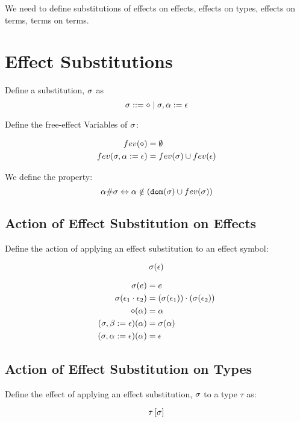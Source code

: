 \documentclass{report}
\newcommand\fev[1]{fev(#1)}
\newcommand\union[0]{\cup}
\begin{document}
        We need to define substitutions of effects on effects,
effects on types, effects on terms, terms on terms.

\section{Effect Substitutions}
Define a substitution, $\sigma$ as 
\begin{equation}
    \sigma ::= \diamond \mid \sigma, \alpha := \epsilon
 \end{equation}

 Define the free-effect Variables of $\sigma$:

 \begin{align*}
     \fev{\nil} & = \emptyset \\
     \fev{\si, \a\setto\e} & = \fev{\si} \union \fev{\e}
 \end{align*}

 We define the property:
 \begin{equation}
    \a\#\si \Leftrightarrow \a \notin (\dom{\si} \cup\fev{\si})
 \end{equation}

 \subsection{Action of Effect Substitution on Effects}

 Define the action of applying an effect substitution to an effect symbol:

 \begin{equation}
    \sigma(\epsilon)
 \end{equation}

 \begin{align}
     \sigma(e) & = e \\
     \sigma(\epsilon_1\cdot\epsilon_2) & = (\sigma(\epsilon_1))\cdot(\sigma(\epsilon_2))\\
     \diamond(\alpha) & = \alpha\\
     (\sigma, \beta:= \epsilon)(\alpha) & = \sigma(\alpha) \\
     (\sigma, \alpha:= \epsilon)(\alpha) & =\epsilon
 \end{align}

 \subsection{Action of Effect Substitution on Types}

 Define the effect of applying an effect substitution, $\sigma$ to a type $\tau$ as:

 $$\tau\left[\sigma\right]$$
\end{document}
